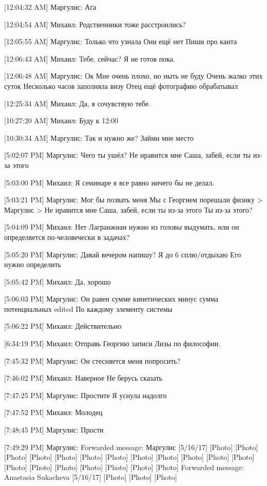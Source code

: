 \documentclass{article}
\begin{document}
[12:04:32 AM] Маргулис:
Ага

[12:04:54 AM] Михаил:
Родственники тоже расстроились?

[12:05:55 AM] Маргулис:
Только что узнала
 Они ещё нет
 Пиши про канта

[12:06:43 AM] Михаил:
Тебе, сейчас? Я не готов пока.

[12:06:48 AM] Маргулис:
Ок
 Мне очень плохо, но ныть не буду
 Очень жалко этих суток
 Несколько часов заполняла визу
 Отец ещё фотографию обрабатывал

[12:25:34 AM] Михаил:
Да, я сочувствую тебе.

[10:27:20 AM] Михаил:
Буду к 12:00

[10:30:34 AM] Маргулис:
Так и нужно же?
 Займи мне место

[5:02:07 PM] Маргулис:
Чего ты ушёл?
 Не нравится мне Саша, забей, если ты из-за этого

[5:03:00 PM] Михаил:
Я семинаре я все равно ничего бы не делал.

[5:03:21 PM] Маргулис:
Мог бы позвать меня
 Мы с Георгием порешали физику
> Маргулис
> Не нравится мне Саша, забей, если ты из-за этого
Ты из-за этого?

[5:04:09 PM] Михаил:
Нет
 Лагранжиан нужно из головы выдумать, или он определяется по-человечески в задачах?

[5:05:20 PM] Маргулис:
Давай вечером напишу? Я до 6 сплю/отдыхаю
 Его нужно определить

[5:05:42 PM] Михаил:
Да, хорошо

[5:06:03 PM] Маргулис:
Он равен сумме кинетических минус сумма потенциальных
edited 
По каждому элементу системы

[5:06:22 PM] Михаил:
Действительно

[6:34:19 PM] Михаил:
Отправь Георгию записи Лизы по философии.

[7:45:32 PM] Маргулис:
Он стесняется меня попросить?

[7:46:02 PM] Михаил:
Наверное
 Не берусь сказать

[7:47:25 PM] Маргулис:
Простите
 Я уснула надолго

[7:47:52 PM] Михаил:
Молодец

[7:48:45 PM] Маргулис:
Прости

[7:49:29 PM] Маргулис:
Forwarded message: Маргулис [5/16/17] 
[Photo]
[Photo]
[Photo]
[Photo]
[Photo]
[Photo]
[Photo]
[Photo]
[Photo]
[Photo]
[Photo]
[Photo]
[Photo]
[Photo]
[Photo]
[Photo]
[Photo]
[Photo]
[Photo]
Forwarded message: Anastasia Sukacheva [5/16/17] 
[Photo]
[Photo]
[Photo]
\end{document}
